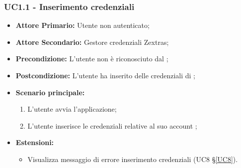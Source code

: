 \subsubsection{UC1.1 - Inserimento credenziali}
\begin{itemize}
\item \textbf{Attore Primario:} Utente non autenticato;
\item \textbf{Attore Secondario:} Gestore credenziali Zextras;
\item \textbf{Precondizione:} L'utente non è riconosciuto dal ;
\item \textbf{Postcondizione:} L'utente ha inserito delle credenziali di ;
\item \textbf{Scenario principale:}
    \begin{enumerate}
    \item L'utente avvia l'applicazione;
    \item L'utente inserisce le credenziali relative al suo account ;
    \end{enumerate}
\item \textbf{Estensioni:}
\begin{itemize}
\item Visualizza messaggio di errore inserimento credenziali (UC8 \S{}\ref{UC8}).
\end{itemize}
\end{itemize}
